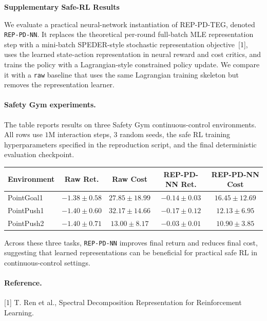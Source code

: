 \documentclass[11pt]{article}
\begin{document}
\begin{center}
\textbf{Supplementary Safe-RL Results}
\end{center}

We evaluate a practical neural-network instantiation of REP-PD-TEG, denoted \texttt{REP-PD-NN}. It replaces the theoretical per-round full-batch MLE representation step with a mini-batch SPEDER-style stochastic representation objective~[1], uses the learned state-action representation in neural reward and cost critics, and trains the policy with a Lagrangian-style constrained policy update. We compare it with a \texttt{raw} baseline that uses the same Lagrangian training skeleton but removes the representation learner.

\paragraph{Safety Gym experiments.}
The table reports results on three Safety Gym continuous-control environments. All rows use $1$M interaction steps, $3$ random seeds, the safe RL training hyperparameters specified in the reproduction script, and the final deterministic evaluation checkpoint.

\begin{center}
\small
\begin{tabular}{lcccc}
\toprule
Environment & Raw Ret. & Raw Cost & REP-PD-NN Ret. & REP-PD-NN Cost \\
\midrule
PointGoal1 & $-1.38 \pm 0.58$ & $27.85 \pm 18.99$ & $\mathbf{-0.14 \pm 0.03}$ & $\mathbf{16.45 \pm 12.69}$ \\
PointPush1 & $-1.40 \pm 0.60$ & $32.17 \pm 14.66$ & $\mathbf{-0.17 \pm 0.12}$ & $\mathbf{12.13 \pm 6.95}$ \\
PointPush2 & $-1.40 \pm 0.71$ & $13.00 \pm 8.17$ & $\mathbf{-0.03 \pm 0.01}$ & $\mathbf{10.90 \pm 3.85}$ \\
\bottomrule
\end{tabular}
\end{center}

Across these three tasks, \texttt{REP-PD-NN} improves final return and reduces final cost, suggesting that learned representations can be beneficial for practical safe RL in continuous-control settings.

\paragraph{Reference.}
[1] T. Ren et al., Spectral Decomposition Representation for Reinforcement Learning.
\end{document}
